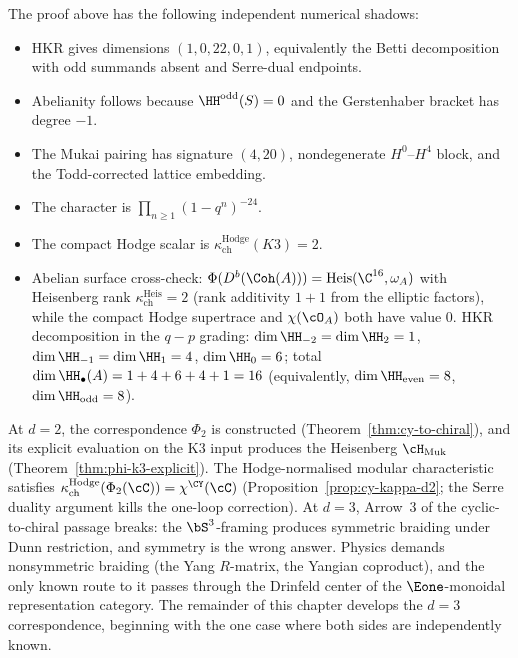 \begin{remark}
\label{rem:phi-k3-explicit-computation}
The proof above has the following independent numerical shadows:
\begin{itemize}
 \item HKR gives dimensions $(1,0,22,0,1)$, equivalently the Betti
 decomposition with odd summands absent and Serre-dual endpoints.
 \item Abelianity follows because \(\HH^{\mathrm{odd}}(S)=0\) and the Gerstenhaber bracket has degree \(-1\).
 \item The Mukai pairing has signature $(4,20)$, nondegenerate
 $H^0$--$H^4$ block, and the Todd-corrected lattice embedding.
 \item The character is \(\prod_{n\geq1}(1-q^n)^{-24}\).
 \item The compact Hodge scalar is
 \(\kappa_{\mathrm{ch}}^{\mathrm{Hodge}}(K3)=2\).
 \item Abelian surface cross-check: $\Phi(D^b(\Coh(A))) = \mathrm{Heis}(\C^{16}, \omega_A)$ with Heisenberg rank $\kappa_{\mathrm{ch}}^{\mathrm{Heis}} = 2$ (rank additivity $1 + 1$ from the elliptic factors), while the compact Hodge supertrace and $\chi(\cO_A)$ both have value $0$. HKR decomposition in the $q-p$ grading: $\dim\HH_{-2}=\dim\HH_2=1$, $\dim\HH_{-1}=\dim\HH_1=4$, $\dim\HH_0=6$; total $\dim\HH_\bullet(A) = 1+4+6+4+1 = 16$ (equivalently, $\dim\HH_{\mathrm{even}}=8$, $\dim\HH_{\mathrm{odd}}=8$).
\end{itemize}
\end{remark}

At $d = 2$, the correspondence $\Phi_2$ is constructed (Theorem~\ref{thm:cy-to-chiral}), and its explicit evaluation on the K3 input produces the Heisenberg $\cH_{\mathrm{Muk}}$ (Theorem~\ref{thm:phi-k3-explicit}). The Hodge-normalised modular characteristic satisfies $\kappa_{\mathrm{ch}}^{\mathrm{Hodge}}(\Phi_2(\cC)) = \chi^{\CY}(\cC)$ (Proposition~\ref{prop:cy-kappa-d2}; the Serre duality argument kills the one-loop correction). At $d = 3$, Arrow~3 of the cyclic-to-chiral passage breaks: the $\bS^3$-framing produces symmetric braiding under Dunn restriction, and symmetry is the wrong answer. Physics demands nonsymmetric braiding (the Yang $R$-matrix, the Yangian coproduct), and the only known route to it passes through the Drinfeld center of the $\Eone$-monoidal representation category. The remainder of this chapter develops the \(d=3\) correspondence, beginning with the one case where both sides are independently known.

